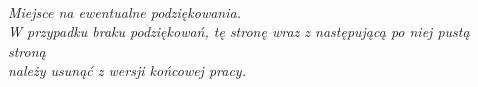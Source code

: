\documentclass[12pt,a4paper,twoside]{report}
\theoremstyle{definition} %
\begin{document}
%
%
%
%

    
    \linespread{1.3}
    \newpage 


    \thispagestyle{empty} %
    ~\vfill
	\newpage
    
\vspace*{16cm}
\thispagestyle{empty}
\begin{flushright}
\textit{Miejsce na ewentualne podziękowania.\\
W przypadku braku podziękowań, tę stronę wraz z następującą po niej pustą stroną\\
należy usunąć z wersji końcowej pracy.}%
\end{flushright}
\newpage

\end{document}
